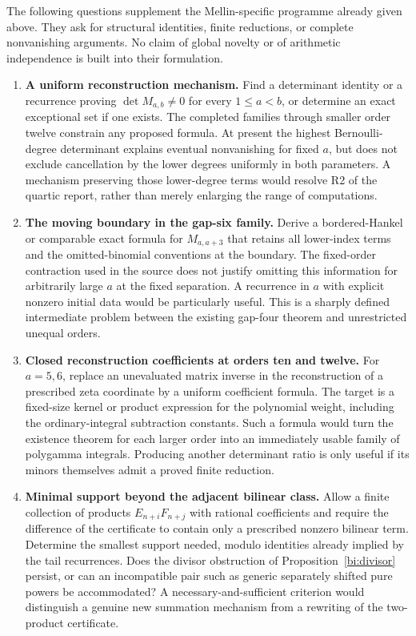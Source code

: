 \documentclass[11pt,letterpaper]{article}
\numberwithin{equation}{section}
\theoremstyle{definition}
\theoremstyle{remark}
\begin{document}
The following questions supplement the Mellin-specific programme
already given above. They ask for structural identities, finite
reductions, or complete nonvanishing arguments. No claim of global
novelty or of arithmetic independence is built into their formulation.

\begin{enumerate}[leftmargin=*,label=\textbf{R\arabic*.}]

\item \textbf{A uniform reconstruction mechanism.}
Find a determinant identity or a recurrence proving
$\det M_{a,b}\ne0$ for every $1\le a<b$, or determine an exact
exceptional set if one exists. The completed families through smaller
order twelve constrain any proposed formula. At present the highest
Bernoulli-degree determinant explains eventual nonvanishing for fixed
$a$, but does not exclude cancellation by the lower degrees uniformly
in both parameters. A mechanism preserving those lower-degree terms
would resolve R2 of the quartic report, rather than merely enlarging
the range of computations.

\item \textbf{The moving boundary in the gap-six family.}
Derive a bordered-Hankel or comparable exact formula for $M_{a,a+3}$
that retains all lower-index terms and the omitted-binomial
conventions at the boundary. The fixed-order contraction used in the
source does not justify omitting this information for arbitrarily
large $a$ at the fixed separation. A recurrence in $a$
with explicit nonzero initial data would be particularly useful.
This is a sharply defined intermediate problem between the existing
gap-four theorem and unrestricted unequal orders.

\item \textbf{Closed reconstruction coefficients at orders ten and twelve.}
For $a=5,6$, replace an unevaluated matrix inverse in the reconstruction
of a prescribed zeta coordinate by a uniform coefficient formula.
The target is a fixed-size kernel or product expression for the
polynomial weight, including the ordinary-integral subtraction
constants. Such a formula would turn the existence theorem for each
larger order into an immediately usable family of polygamma
integrals. Producing another determinant ratio is only useful if its
minors themselves admit a proved finite reduction.

\item \textbf{Minimal support beyond the adjacent bilinear class.}
Allow a finite collection of products $E_{n+i}F_{n+j}$ with rational
coefficients and require the difference of the certificate to contain
only a prescribed nonzero bilinear term. Determine the smallest
support needed, modulo identities already implied by the tail
recurrences. Does the divisor obstruction of
Proposition~\ref{bi:divisor} persist, or can an incompatible pair such
as generic separately shifted pure powers be accommodated?
A necessary-and-sufficient criterion would distinguish a genuine new
summation mechanism from a rewriting of the two-product certificate.


\end{enumerate}
\end{document}
